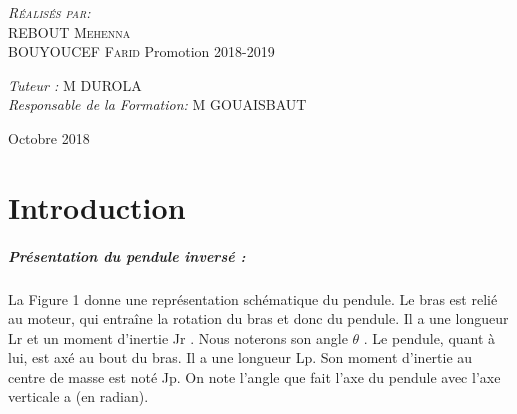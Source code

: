 \documentclass[12pt, a4paper, openany]{report}
\begin{document}
\begin{titlepage}
\begin{sffamily}
\begin{center}
    \begin{minipage}{0.4\textwidth}
      \begin{flushleft} \large
         \textsc{\emph {Réalisés par:} \\REBOUT Mehenna}\\
         \textsc{BOUYOUCEF Farid}   
          \newline
          Promotion 2018-2019 \\
      \end{flushleft}
    \end{minipage}
    \begin{minipage}{0.4\textwidth}
      \begin{flushright} \large
        \emph{Tuteur :}  \textsc{M DUROLA}\\
        \emph{Responsable de la Formation:} \textsc{M GOUAISBAUT}
      \end{flushright}
    \end{minipage}

    \vfill

    {\large Octobre 2018}

  \end{center}
  \end{sffamily}      
          
  \end{titlepage}
  
\makeatother




   
\renewcommand{\contentsname}{Sommaire}
\tableofcontents
\listoffigures
\listoftables



\chapter*{Introduction}

\paragraph{Présentation du pendule inversé :} La Figure 1 donne une représentation schématique du pendule. Le bras est relié au moteur, qui entraîne la rotation du bras et donc du pendule. Il a une longueur L{r} et un moment d'inertie J{r} . Nous noterons son angle $\theta$ . Le pendule, quant à lui, est axé au bout du bras. Il a une longueur L{p}. Son moment d'inertie au centre de masse est noté J{p}. On note l'angle que fait l'axe du pendule avec l'axe verticale a (en radian).
\end{document}
